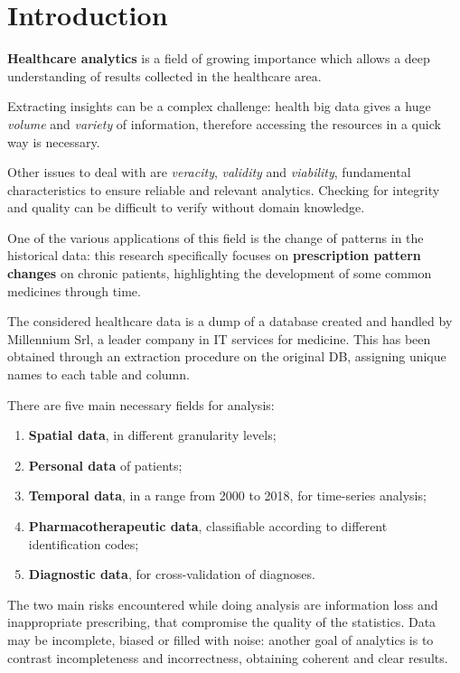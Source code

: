 \chapter{Introduction}
\textbf{Healthcare analytics} is a field of growing importance which allows a deep understanding of results collected in the healthcare area. 

Extracting insights can be a complex challenge: health big data gives a huge \textit{volume} and \textit{variety} of information, therefore accessing the resources in a quick way is necessary. 

Other issues to deal with are \textit{veracity}, \textit{validity} and \textit{viability}, fundamental characteristics to ensure reliable and relevant analytics. Checking for integrity and quality can be difficult to verify without domain knowledge\cite{4vs}.

One of the various applications of this field is the change of patterns in the historical data: this research specifically focuses on \textbf{prescription pattern changes} on chronic patients, highlighting the development of some common medicines through time.

The considered healthcare data is a dump of a database created and handled by Millennium Srl\cite{millewin}, a leader company in IT services for medicine. This has been obtained through an extraction procedure on the original DB, assigning unique names to each table and column.

There are five main necessary fields for analysis\cite{DC}:
\begin{enumerate}
	\item \textbf{Spatial data}, in different granularity levels;
	\item \textbf{Personal data} of patients;
	\item \textbf{Temporal data}, in a range from 2000 to 2018, for time-series analysis;
	\item \textbf{Pharmacotherapeutic data}, classifiable according to different identification codes;
	\item \textbf{Diagnostic data}, for cross-validation of diagnoses.
\end{enumerate}

The two main risks encountered while doing analysis are information loss and inappropriate prescribing, that compromise the quality of the statistics. Data may be incomplete, biased or filled with noise: another goal of analytics is to contrast incompleteness and incorrectness, obtaining coherent and clear results.
